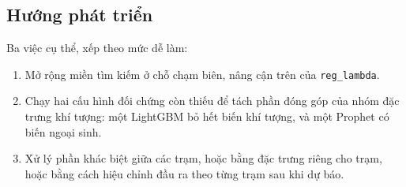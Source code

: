 \FloatBarrier
\subsection{Hướng phát triển}

Ba việc cụ thể, xếp theo mức dễ làm:

\begin{enumerate}
    \item Mở rộng miền tìm kiếm ở chỗ chạm biên, nâng cận trên của \texttt{reg\_lambda}.
    \item Chạy hai cấu hình đối chứng còn thiếu để tách phần đóng góp của nhóm đặc trưng khí
    tượng: một LightGBM bỏ hết biến khí tượng, và một Prophet có biến ngoại sinh.
    \item Xử lý phần khác biệt giữa các trạm, hoặc bằng đặc trưng riêng cho trạm, hoặc bằng
    cách hiệu chỉnh đầu ra theo từng trạm sau khi dự báo.
\end{enumerate}


\setcounter{topnumber}{2}
\setcounter{bottomnumber}{1}
\setcounter{totalnumber}{3}
\renewcommand{\topfraction}{0.7}
\renewcommand{\bottomfraction}{0.3}
\renewcommand{\textfraction}{0.2}
\renewcommand{\floatpagefraction}{0.5}

\newpage